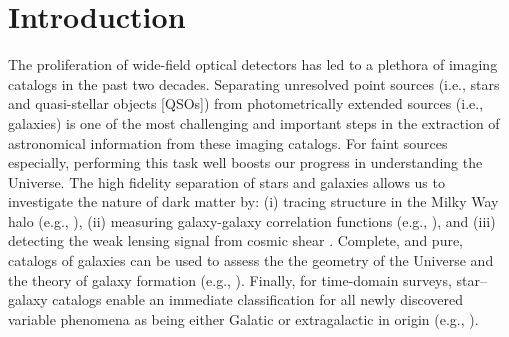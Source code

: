 \documentclass[twocolumn, dvipdfmx]{aastex62}
\begin{document}


\section{Introduction}\label{sec:intro}

The proliferation of wide-field optical detectors has led to a plethora of
imaging catalogs in the past two decades. Separating unresolved point sources (i.e., stars and quasi-stellar objects
[QSOs]) from photometrically extended sources (i.e., galaxies) is one of the
most challenging and important steps in the extraction of astronomical
information from these imaging catalogs. For faint sources especially,
performing this task well boosts our progress in understanding the Universe.
The high fidelity separation of stars and galaxies allows us to investigate
the nature of dark matter by: (i) tracing structure in the Milky Way halo
(e.g., \citealt{Belokurov06}), (ii) measuring galaxy-galaxy correlation
functions (e.g., \citealt{Ross11, Ho15}), and (iii) detecting the weak
lensing signal from cosmic shear \citep{Soumagnac15}. Complete, and pure,
catalogs of galaxies can be used to assess the the geometry of the Universe
\citep{Yasuda01} and the theory of galaxy formation (e.g.,
\citealt{Loveday12, Moorman15}). Finally, for time-domain surveys,
star--galaxy catalogs enable an immediate classification for all newly
discovered variable phenomena as being either Galatic or extragalactic in
origin (e.g., \citealt{Berger12,Miller17}).
\end{document}

